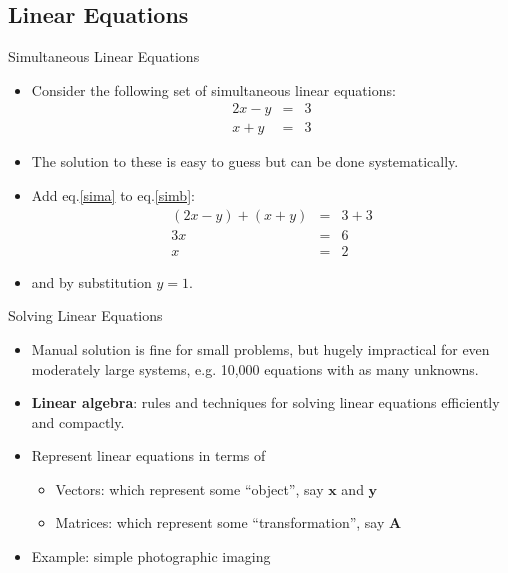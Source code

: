 \documentclass{beamer}
\newcommand{\bx}{\mathbf{x}}
\newcommand{\by}{\mathbf{y}}
\newcommand{\bA}{\mathbf{A}}
\begin{document}
\subsection{Linear Equations}
\begin{frame}{Simultaneous Linear Equations}
  \begin{itemize}
    \item Consider the following set of simultaneous linear equations:
      \begin{eqnarray}
        2x-y &=& 3 \label{sima}\\
        x+y &=&3 \label{simb}
      \end{eqnarray}
    \item The solution to these is easy to guess but can be done systematically.
    \item Add eq.\eqref{sima} to eq.\eqref{simb}:
      \begin{eqnarray*}
        (2x-y)+(x+y) &=& 3+3 \\
        3x&=&6\\
        x&=&2
      \end{eqnarray*}
      \item and by substitution $y=1$.
        \end{itemize}
\end{frame}


\begin{frame}{Solving Linear Equations}
  \begin{itemize}
    \item Manual solution is fine for small problems, but hugely impractical for even moderately large systems, e.g. 10,000 equations with as many unknowns.
    \item \textbf{Linear algebra}: rules and techniques for solving linear equations efficiently and compactly.
    \item Represent linear equations in terms of
      \begin{itemize}
        \item Vectors: which represent some ``object'', say $\bx$ and $\by$
        \item Matrices: which represent some ``transformation'', say $\bA$
      \end{itemize}
    \item Example: simple photographic imaging 
  \end{itemize}
\end{frame}
\end{document}

